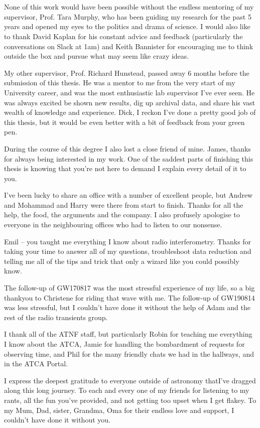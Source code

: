 \chapter*{\vspace{-30pt}}
\vspace{-10pt}
None of this work would have been possible without the endless mentoring of my supervisor, Prof. Tara Murphy, who has been guiding my research for the past 5 years and opened my eyes to the politics and drama of science. I would also like to thank David Kaplan for his constant advice and feedback (particularly the conversations on Slack at 1am) and Keith Bannister for encouraging me to think outside the box and pursue what may seem like crazy ideas.

My other supervisor, Prof. Richard Hunstead, passed away 6 months before the submission of this thesis. He was a mentor to me from the very start of my University career, and was the most enthusiastic lab supervisor I've ever seen. He was always excited be shown new results, dig up archival data, and share his vast wealth of knowledge and experience. Dick, I reckon I've done a pretty good job of this thesis, but it would be even better with a bit of feedback from your green pen.

During the course of this degree I also lost a close friend of mine. James, thanks for always being interested in my work. One of the saddest parts of finishing this thesis is knowing that you're not here to demand I explain every detail of it to you.

I've been lucky to share an office with a number of excellent people, but Andrew and Mohammad and Harry were there from start to finish. Thanks for all the help, the food, the arguments and the company. I also profusely apologise to everyone in the neighbouring offices who had to listen to our nonsense.

Emil -- you taught me everything I know about radio interferometry. Thanks for taking your time to answer all of my questions, troubleshoot data reduction and telling me all of the tips and trick that only a wizard like you could possibly know.

The follow-up of GW170817 was the most stressful experience of my life, so a big thankyou to Christene for riding that wave with me. The follow-up of GW190814 was less stressful, but I couldn't have done it without the help of Adam and the rest of the radio transients group.

I thank all of the ATNF staff, but particularly Robin for teaching me everything I know about the ATCA, Jamie for handling the bombardment of requests for observing time, and Phil for the many friendly chats we had in the hallways, and in the ATCA Portal.

I express the deepest gratitude to everyone outside of astronomy thatI've dragged along this long journey. To each and every one of my friends for listening to my rants, all the fun you've provided, and not getting too upset when I get flakey. To my Mum, Dad, sister, Grandma, Oma for their endless love and support, I couldn't have done it without you.
